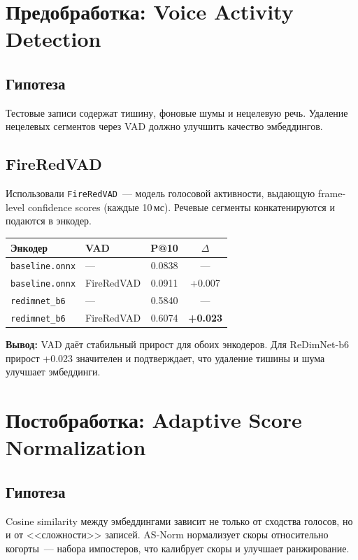 \documentclass[12pt,a4paper]{article}
\begin{document}
\section{Предобработка: Voice Activity Detection}

\subsection{Гипотеза}

Тестовые записи содержат тишину, фоновые шумы и нецелевую речь. Удаление нецелевых сегментов через VAD должно улучшить качество эмбеддингов.

\subsection{FireRedVAD}

Использовали \texttt{FireRedVAD}~--- модель голосовой активности, выдающую frame-level confidence scores (каждые 10\,мс). Речевые сегменты конкатенируются и подаются в энкодер.

\begin{tabular}{l l c c}
\hline
Энкодер & VAD & P@10 & $\Delta$ \\
\hline
\texttt{baseline.onnx} & --- & 0.0838 & --- \\
\texttt{baseline.onnx} & FireRedVAD & 0.0911 & +0.007 \\
\texttt{redimnet\_b6} & --- & 0.5840 & --- \\
\texttt{redimnet\_b6} & FireRedVAD & 0.6074 & \textbf{+0.023} \\
\hline
\end{tabular}

\bigskip
\textbf{Вывод:} VAD даёт стабильный прирост для обоих энкодеров. Для ReDimNet-b6 прирост +0.023 значителен и подтверждает, что удаление тишины и шума улучшает эмбеддинги.

\section{Постобработка: Adaptive Score Normalization}

\subsection{Гипотеза}

Cosine similarity между эмбеддингами зависит не только от сходства голосов, но и от <<сложности>> записей. AS-Norm нормализует скоры относительно когорты~--- набора импостеров, что калибрует скоры и улучшает ранжирование.
\end{document}
